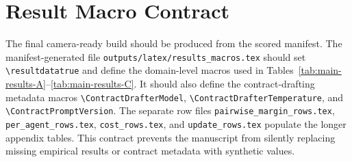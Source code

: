 \documentclass{article}
\newcommand{\fillfromdata}{\textsc{fill}}
\newif\ifresultdata
\providecommand{\ContractDrafterModel}{\fillfromdata}
\providecommand{\ContractDrafterTemperature}{\fillfromdata}
\providecommand{\ContractPromptVersion}{\fillfromdata}
\begin{document}
\section{Result Macro Contract}
\label{app:macro-contract}

The final camera-ready build should be produced from the scored manifest. The
manifest-generated file \texttt{outputs/latex/results\_macros.tex} should set
\verb|\resultdatatrue| and define the domain-level macros used in
Tables~\ref{tab:main-results-A}--\ref{tab:main-results-C}. It should also
define the contract-drafting metadata macros
\verb|\ContractDrafterModel|, \verb|\ContractDrafterTemperature|, and
\verb|\ContractPromptVersion|. The separate row files
\texttt{pairwise\_margin\_rows.tex}, \texttt{per\_agent\_rows.tex},
\texttt{cost\_rows.tex}, and \texttt{update\_rows.tex} populate the longer
appendix tables. This contract prevents the manuscript from silently replacing
missing empirical results or contract metadata with synthetic values.

\clearpage
{}
\end{document}
